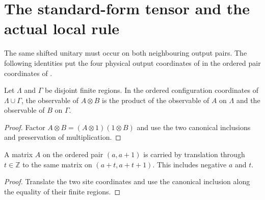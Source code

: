 \section{The standard-form tensor and the actual local rule}
\label{sec:qca_tensor_local_rule}

The same shifted unitary must occur on both neighbouring output pairs.
The following identities put the four physical output coordinates of
\cite[equation~\textup{StandardForm}, lines~603--622]{Cirac2017MPU}
in the ordered pair coordinates of
\cite[equations~\textup{locMarg}, \textup{bruleU}, \textup{bruleV},
    lines~980--1008]{SchumacherWerner2004QCA}.

\begin{lemma}
    \label{lem:qca_bipartite_kronecker_product}
    \leanok
    Let $\Lambda$ and $\Gamma$ be disjoint finite regions. In the ordered
    configuration coordinates of $\Lambda\cup\Gamma$, the observable of
    $A\otimes B$ is the product of the observable of $A$ on $\Lambda$
    and the observable of $B$ on $\Gamma$.
\end{lemma}
\begin{proof}
    \leanok
    Factor $A\otimes B=(A\otimes 1)(1\otimes B)$ and use the two
    canonical inclusions and preservation of multiplication.
\end{proof}

\begin{lemma}
    \label{lem:qca_consecutive_pair_observable_translation}
    \leanok
    A matrix $A$ on the ordered pair $(a,a+1)$ is carried by translation
    through $t\in\mathbb Z$ to the same matrix on
    $(a+t,a+t+1)$. This includes negative $a$ and $t$.
\end{lemma}
\begin{proof}
    \leanok
    Translate the two site coordinates and use the canonical inclusion
    along the equality of their finite regions.
\end{proof}

